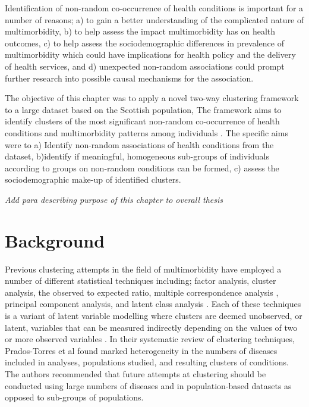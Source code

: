 \documentclass[12pt,]{report}
\begin{document}
Identification of non-random co-occurrence of health conditions is
important for a number of reasons; a) to gain a better understanding of
the complicated nature of multimorbidity, b) to help assess the impact
multimorbidity has on health outcomes, c) to help assess the
sociodemographic differences in prevalence of multimorbidity which could
have implications for health policy and the delivery of health services,
and d) unexpected non-random associations could prompt further research
into possible causal mechanisms for the association.

The objective of this chapter was to apply a novel two-way clustering
framework to a large dataset based on the Scottish population, The
framework aims to identify clusters of the most significant non-random
co-occurrence of health conditions and multimorbidity patterns among
individuals \citep{RN72}. The specific aims were to a) Identify
non-random associations of health conditions from the dataset,
b)identify if meaningful, homogeneous sub-groups of individuals
according to groups on non-random conditions can be formed, c) assess
the sociodemographic make-up of identified clusters.

\emph{Add para describing purpose of this chapter to overall thesis}

\section{Background}\label{sec:clust-background}

Previous clustering attempts in the field of multimorbidity have
employed a number of different statistical techniques including; factor
analysis, cluster analysis, the observed to expected ratio, multiple
correspondence analysis \citep{RN98}, principal component analysis, and
latent class analysis \citep{RN109}. Each of these techniques is a
variant of latent variable modelling where clusters are deemed
unobserved, or latent, variables that can be measured indirectly
depending on the values of two or more observed variables \citep{RN291}.
In their systematic review of clustering techniques, Prados-Torres et al
\citeyearpar{RN98} found marked heterogeneity in the numbers of diseases
included in analyses, populations studied, and resulting clusters of
conditions. The authors recommended that future attempts at clustering
should be conducted using large numbers of diseases and in
population-based datasets as opposed to sub-groups of populations.
\end{document}

